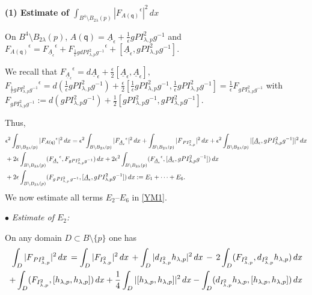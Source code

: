 \documentclass[11pt]{article}
\numberwithin{equation}{section} \setlength{\topmargin}{-35pt}
\newcommand{\q}{\mathsf{q}}
\begin{document}
\medskip

\noindent\textbf{(1) Estimate of $\int_{B^4\setminus
B_{2\lambda}(p)}|{F_{A(\q)}}^{\epsilon}|^2\,dx$}

\noindent On $B^4\setminus B_{2\lambda}(p)$,
$A(\q)=\underline{A}_{\epsilon}+\frac{1}{\epsilon}g
PI^2_{\lambda,p}g^{-1}$ and ${F_{A(\q)}}^{\epsilon}={F_{\underline
A_\epsilon}}^{\epsilon}+{F_{\frac{1}{\epsilon}gdPI^2_{\lambda,p}g^{-1}}}^{\epsilon}+[\underline
A_\epsilon , gPI^2_{\lambda,p}g^{-1}].$

\noindent We recall that ${F_{\underline
A_\epsilon}}^{\epsilon}=d\underline
A_\epsilon+\frac{\epsilon}{2}[\underline A_\epsilon,\underline
A_\epsilon],$
 ${F_{\frac{1}{\epsilon}gPI^2_{\lambda,p}g^{-1}}}^{\epsilon}=
d (\frac{1}{\epsilon}gPI^2_{\lambda,p}g^{-1}) + \frac{\epsilon}{2}
[\frac{1}{\epsilon}gPI^2_{\lambda,p}g^{-1},
\frac{1}{\epsilon}gPI^2_{\lambda,p}g^{-1}] = \frac{1}{\epsilon}
F_{gPI^2_{\lambda,p}g^{-1}}$ with $F_{gPI^2_{\lambda,p}g^{-1}} := d
(gPI^2_{\lambda,p}g^{-1}) +\frac{1}{2} [gPI^2_{\lambda,p}g^{-1}, g
PI^2_{\lambda,p}g^{-1}]$.

\noindent Thus,
\begin{align}
\label{YM1}   &\epsilon^2\int_{B\setminus
B_{2\lambda}(p)}|{F_{A(\q)}}^{\epsilon}|^2\,dx=\epsilon^2
\int_{B\setminus B_{2\lambda}(p)}|{F_{\underline
A_\epsilon}}^{\epsilon}|^2 \,dx+\int_{B\setminus
B_{2\lambda}(p)}|F_{\,PI^2_{\lambda,p}}|^2\,dx
+\epsilon^2\int_{B\setminus
B_{2\lambda}(p)}|[\underline A_\epsilon , gPI^2_{\lambda,p}g^{-1}]|^2\,dx\notag\\
  &+2\epsilon\int_{B\setminus
B_{2\lambda}(p)}({F_{\underline
A_\epsilon}}^{\epsilon},F_{gPI^2_{\lambda,p}g^{-1}})\,dx+
 2\epsilon^2 \int_{B\setminus
B_{2\lambda}(p)}({F_{\underline A_\epsilon}}^{\epsilon},[\underline
A_\epsilon,
gPI^2_{\lambda,p}g^{-1}])\,dx\notag\\
  &+2\epsilon\int_{B\setminus
B_{2\lambda}(p)}(F_{g\,PI^2_{\lambda,p}\,g^{-1}},[\underline
A_\epsilon,
 gPI^2_{\lambda,p}g^{-1}])\,dx:= E_1 + \cdots +
 E_6.
\end{align}
We now estimate all terms $E_2$--$E_6$ in \eqref{YM1}.

\medskip

\noindent $\bullet$ \emph{Estimate of $E_2$:}

\noindent On any domain $D\subset B\setminus \{p\}$ one has
\begin{align}
 \int_{D}|F_{\,PI^2_{\lambda,p}}|^2\,dx \,=
\int_{D}|F_{I^2_{\lambda,p}}|^2\,dx\,+
\int_{D}|d_{I^2_{\lambda,p}}h_{\lambda,p}|^2\,dx\,
-\,2\int_{D}(F_{I^2_{\lambda,p}},d_{I^2_{\lambda,p}}h_{\lambda,p})\,dx\notag\\
 +\int_{D}(F_{I^2_{\lambda,p}},[h_{\lambda,p},h_{\lambda,p}])\,dx+
\frac{1}{4}\int_{D}|[h_{\lambda,p},h_{\lambda,p}]|^2\,dx
-\int_{D}(d_{I^2_{\lambda,p}}h_{\lambda,p},[h_{\lambda,p},h_{\lambda,p}])\,dx\notag
\end{align}
\end{document}

